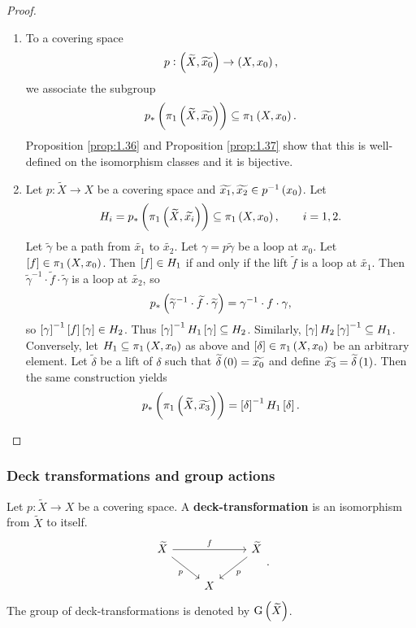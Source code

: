 \begin{proof}
\hfill
\begin{enumerate}
\item To a covering space
$$ p : \br{\widetilde{X}, \widetilde{x_0}} \to \br{X, x_0}, $$
we associate the subgroup
$$ p_*\br{\pi_1\br{\widetilde{X}, \widetilde{x_0}}} \subseteq \pi_1\br{X, x_0}. $$
Proposition \ref{prop:1.36} and Proposition \ref{prop:1.37} show that this is well-defined on the isomorphism classes and it is bijective.

\pagebreak

\item Let $ p : \widetilde{X} \to X $ be a covering space and $ \widetilde{x_1}, \widetilde{x_2} \in p^{-1}\br{x_0} $. Let
$$ H_i = p_*\br{\pi_1\br{\widetilde{X}, \widetilde{x_i}}} \subseteq \pi_1\br{X, x_0}, \qquad i = 1, 2. $$
Let $ \widetilde{\gamma} $ be a path from $ \widetilde{x_1} $ to $ \widetilde{x_2} $. Let $ \gamma = p\widetilde{\gamma} $ be a loop at $ x_0 $. Let $ \sbr{f} \in \pi_1\br{X, x_0} $. Then $ \sbr{f} \in H_1 $ if and only if the lift $ \widetilde{f} $ is a loop at $ \widetilde{x_1} $. Then $ \widetilde{\gamma}^{-1} \cdot \widetilde{f} \cdot \widetilde{\gamma} $ is a loop at $ \widetilde{x_2} $, so
$$ p_*\br{\widetilde{\gamma}^{-1} \cdot \widetilde{f} \cdot \widetilde{\gamma}} = \gamma^{-1} \cdot f \cdot \gamma, $$
so $ \sbr{\gamma}^{-1}\sbr{f}\sbr{\gamma} \in H_2 $. Thus $ \sbr{\gamma}^{-1}H_1\sbr{\gamma} \subseteq H_2 $. Similarly, $ \sbr{\gamma}H_2\sbr{\gamma}^{-1} \subseteq H_1 $. Conversely, let $ H_1 \subseteq \pi_1\br{X, x_0} $ as above and $ \sbr{\delta} \in \pi_1\br{X, x_0} $ be an arbitrary element. Let $ \widetilde{\delta} $ be a lift of $ \delta $ such that $ \widetilde{\delta}\br{0} = \widetilde{x_0} $ and define $ \widetilde{x_3} = \widetilde{\delta}\br{1} $. Then the same construction yields
$$ p_*\br{\pi_1\br{\widetilde{X}, \widetilde{x_3}}} = \sbr{\delta}^{-1}H_1\sbr{\delta}. $$
\end{enumerate}
\end{proof}

\subsubsection{Deck transformations and group actions}

\begin{definition*}
Let $ p : \widetilde{X} \to X $ be a covering space. A \textbf{deck-transformation} is an isomorphism from $ \widetilde{X} $ to itself.
$$
\begin{tikzcd}
\widetilde{X} \arrow{rr}{f} \arrow{dr}[swap]{p} & & \widetilde{X} \arrow{dl}{p} \\
& X &
\end{tikzcd}.
$$
The group of deck-transformations is denoted by $ \G\br{\widetilde{X}} $.
\end{definition*}

